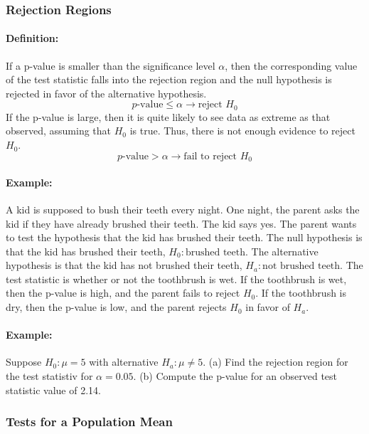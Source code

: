\subsubsection*{Rejection Regions}
\paragraph*{Definition:} If a p-value is smaller than the significance level $\alpha$, then the 
corresponding value of the test statistic falls into the rejection region and the null hypothesis is rejected in favor of the alternative hypothesis.
\[
    p\text{-value} \leq \alpha \rightarrow \text{reject } H_0
\]
If the p-value is large, then it is quite likely to see data as extreme as that observed, assuming that $H_0$ is true. Thus, there is not enough evidence to reject $H_0$.
\[
    p\text{-value} > \alpha \rightarrow \text{fail to reject } H_0
\]

\paragraph*{Example:}
A kid is supposed to bush their teeth every night. One night, the parent asks the kid if they have already brushed their teeth.
The kid says yes. The parent wants to test the hypothesis that the kid has brushed their teeth. The null hypothesis is that the kid has brushed their teeth,
$H_0: \text{brushed teeth}$. The alternative hypothesis is that the kid has not brushed their teeth, $H_a: \text{not brushed teeth}$.
The test statistic is whether or not the toothbrush is wet. If the toothbrush is wet, then the p-value is high, and the parent fails to reject $H_0$.
If the toothbrush is dry, then the p-value is low, and the parent rejects $H_0$ in favor of $H_a$.

\paragraph*{Example:}
Suppose $H_0 : \mu = 5$ with alternative $H_a : \mu \neq 5$. (a) Find the rejection region for the test statistiv for $\alpha = 0.05$.
(b) Compute the p-value for an observed test statistic value of 2.14.

\subsubsection*{Tests for a Population Mean}
